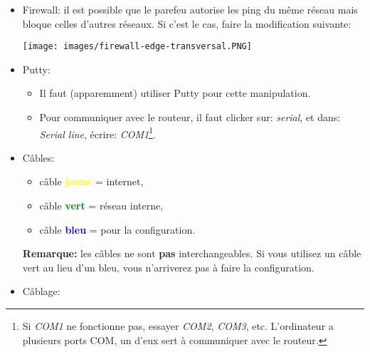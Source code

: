 \documentclass[a4paper]{article}
\begin{document}
\begin{itemize}
\begin{enumerate}
\end{enumerate}





\item Firewall: il est possible que le parefeu autorise les ping du même réseau mais bloque celles d'autres réseaux. Si c'est le cas, faire la modification suivante:
\begin{center}
    \texttt{[image: images/firewall-edge-transversal.PNG]}
\end{center}





\item Putty:
\begin{itemize}
    \item Il faut (apparemment) utiliser Putty pour cette manipulation.
    \item Pour communiquer avec le routeur, il faut clicker sur: \textit{serial}, et dans: \textit{Serial line}, écrire: \textit{COM1}\footnote{Si \textit{COM1} ne fonctionne pas, essayer \textit{COM2}, \textit{COM3}, etc. L'ordinateur a plusieurs ports COM, un d'eux sert à communiquer avec le routeur.}.
\end{itemize}





\item Câbles:
\begin{itemize}
    \item câble \textcolor{yellow}{\textbf{jaune}} = internet,
    \item câble \textcolor{green}{\textbf{vert}} = réseau interne,
    \item câble \textcolor{blue}{\textbf{bleu}} = pour la configuration.
\end{itemize}
\textbf{Remarque:} les câbles ne sont \textbf{pas} interchangeables. Si vous utilisez un câble vert au lieu d'un bleu, vous n'arriverez pas à faire la configuration.





\item Câblage:
\begin{enumerate}


\end{enumerate}
\end{itemize}
\end{document}
